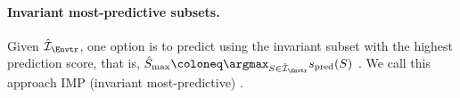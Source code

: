 

\paragraph{Invariant most-predictive subsets.}
Given $\hat{\mathcal{I}}_{\Envtr}$, one option is to predict using the invariant subset with the highest prediction score, that is, $\hat{S}_\mathrm{max} \coloneq \argmax_{S \in \hat{\mathcal{I}}_{\Envtr}} s_\mathrm{pred}(S)$ \citep{rojas-carullaInvariantModelsCausal2018}. 
We call this approach IMP (invariant most-predictive) \citep{Gnecco2026jmlr}.




